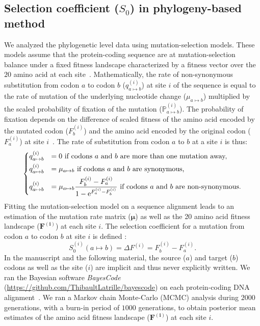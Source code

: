 \documentclass{article}
\newcommand{\UniDimArray}[1]{\bm{#1}}
\newcommand{\e}{\textrm{e}}
\newcommand{\proba}{\mathbb{P}}
\newcommand{\Sphy}{S_{0}}
\begin{document}
    \subsection{Selection coefficient ($\Sphy$) in phylogeny-based method}
    \label{subsec:s-phylogeny-method}

    We analyzed the phylogenetic level data using mutation-selection models.
    These models assume that the protein-coding sequence are at mutation-selection balance under a fixed fitness landscape characterized by a fitness vector over the $20$ amino acid at each site~\cite{yang_mutationselection_2008, halpern_evolutionary_1998, rodrigue_mechanistic_2010}.
    Mathematically, the rate of non-synonymous substitution from codon $a$ to codon $b$ ($q_{a \mapsto b}^{(i)}$) at site $i$ of the sequence is equal to the rate of mutation of the underlying nucleotide change ($\mu_{a \mapsto b}$) multiplied by the scaled probability of fixation of the mutation ($\proba_{a \mapsto b}^{(i)}$).
    The probability of fixation depends on the difference of scaled fitness of the amino acid encoded by the mutated codon ($F_b^{(i)}$) and the amino acid encoded by the original codon ($F_a^{(i)}$) at site $i$~\cite{wright_evolution_1931a, fisher_genetical_1930a}.
    The rate of substitution from codon $a$ to $b$ at a site $i$ is thus:
    \begin{equation}
        \begin{dcases}
            q_{a \mapsto b}^{(i)} & = 0 \text{ if codons $a$ and $b$ are more than one mutation away,} \\
            q_{a \mapsto b}^{(i)} & = \mu_{a \mapsto b} \text{ if codons $a$ and $b$ are synonymous,} \\
            q_{a \mapsto b}^{(i)} & = \mu_{a \mapsto b} \dfrac{F_b^{(i)} - F_a^{(i)}}{1 - \e^{F_a^{(i)} - F_b^{(i)}}} \text{ if codons $a$ and $b$ are non-synonymous}.
        \end{dcases}
    \end{equation}
    Fitting the mutation-selection model on a sequence alignment leads to an estimation of the mutation rate matrix ($\UniDimArray{\mu}$) as well as the 20 amino acid fitness landscape ($\UniDimArray{F^{(i)}}$) at each site $i$.
    The selection coefficient for a mutation from codon $a$ to codon $b$ at site $i$ is defined :
    \begin{equation}
        \Sphy^{(i)} (a \mapsto b) = \Delta F^{(i)} = F^{(i)}_{b} - F^{(i)}_{a}.
    \end{equation}
    In the manuscript and the following material, the source ($a$) and target ($b$) codons as well as the site ($i$) are implicit and thus never explicitly written.
    We ran the Bayesian software \textit{BayesCode} (\url{https://github.com/ThibaultLatrille/bayescode}) on each protein-coding DNA alignment~\cite{rodrigue_bayesian_2021}.
    We ran a Markov chain Monte-Carlo (MCMC) analysis during $2000$ generations, with a burn-in period of $1000$ generations, to obtain posterior mean estimates of the amino acid fitness landscape ($\UniDimArray{F^{(i)}}$) at each site $i$\@.
\end{document}
